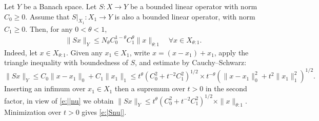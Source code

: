 \documentclass[10pt, a4paper]{iopart}
\newcommand{\norm}[2]{     \| #1       \|_{ #2 }}
\theoremstyle{remark}
\theoremstyle{definition}
\begin{document}
Let $Y$ be a Banach space.
%
Let $S : X \to Y$ be a bounded linear operator with norm $C_0 \geq 0$.
%
Assume that 
$S|_{X_1} : X_1 \to Y$ 
is also a bounded linear operator, with norm $C_1 \geq 0$.
%
Then, for any $0 < \theta < 1$, 
\begin{align}
\label{e:|Snu|}
	\norm{S x}{Y}
	\leq
	N_{\theta}
	C_0^{1-\theta} C_1^\theta
	\norm{x}{\theta:1}
	\quad
	\forall x \in X_{\theta:1}
	.
\end{align}
%
%
Indeed,
let $x \in X_{\theta:1}$.
%
Given any $x_1 \in X_1$, 
write $x = (x - x_1) + x_1$,
apply the triangle inequality with boundedness of $S$,
and estimate by Cauchy--Schwarz:
$ %
	\norm{S x}{Y}
	\leq
	C_0 \norm{x - x_1}{0}
	+
	C_1 \norm{x_1}{1}
	\leq
	t^\theta (C_0^2 + t^{-2} C_1^2)^{1/2}
	\times
	t^{-\theta}
	(\norm{x - x_1}{0}^2 + t^2 \norm{x_1}{1}^2)^{1/2}
	.
$ %
%
Inserting 
an
infimum over $x_1 \in X_1$ 
then a supremum over $t > 0$
in the second factor,
in view of \eqref{e:||nu}
we obtain
$ %
	\norm{S x}{Y}
	\leq
	t^\theta (C_0^2 + t^{-2} C_1^2)^{1/2}
	\times
	\norm{x}{\theta:1}
	.
$ %
%
Minimization over $t > 0$ gives \eqref{e:|Snu|}.





%



\end{document}
